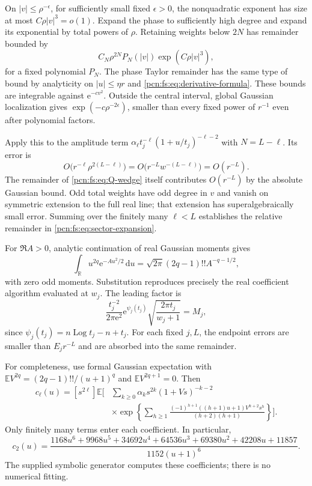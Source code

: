 \documentclass[11pt,letterpaper]{article}
\theoremstyle{remark}\newtheorem{remark}[theorem]{Remark}
\newcommand{\E}{\mathbb E}
\newcommand{\dd}{\,\mathrm d}
\newcommand{\ee}{\mathrm e}
\newcommand{\Log}{\operatorname{Log}}
\begin{document}
On $|v|\le\rho^{-\epsilon}$, for sufficiently small fixed $\epsilon>0$, the nonquadratic exponent has size at most $C\rho|v|^3=o(1)$. Expand the phase to sufficiently high degree and expand its exponential by total powers of $\rho$. Retaining weights below $2N$ has remainder bounded by
\[
 C_N\rho^{2N}P_N(|v|)\exp(C\rho|v|^3),
\]
for a fixed polynomial $P_N$. The phase Taylor remainder has the same type of bound by analyticity on $|u|\le\eta r$ and \eqref{pcn:fs:eq:derivative-formula}. These bounds are integrable against $\ee^{-cv^2}$. Outside the central interval, global Gaussian localization gives $\exp(-c\rho^{-2\epsilon})$, smaller than every fixed power of $r^{-1}$ even after polynomial factors.

Apply this to the amplitude term
$\alpha_\ell t_j^{-\ell}(1+u/t_j)^{-\ell-2}$ with $N=L-\ell$.
Its error is
\[
 O\bigl(r^{-\ell}\rho^{2(L-\ell)}\bigr)
       =O\bigl(r^{-L}w^{-(L-\ell)}\bigr)=O(r^{-L}).
\]
The remainder of \eqref{pcn:fs:eq:Q-wedge} itself contributes $O(r^{-L})$ by the absolute Gaussian bound. Odd total weights have odd degree in $v$ and vanish on symmetric extension to the full real line; that extension has superalgebraically small error. Summing over the finitely many $\ell<L$ establishes the relative remainder in \eqref{pcn:fs:eq:sector-expansion}.

For $\Re A>0$, analytic continuation of real Gaussian moments gives
\[
 \int_{\mathbb R}u^{2q}\ee^{-Au^2/2}\dd u
       =\sqrt{2\pi}(2q-1)!!A^{-q-1/2},
\]
with zero odd moments. Substitution reproduces precisely the real coefficient algorithm evaluated at $w_j$. The leading factor is
\[
 \frac{t_j^{-2}}{2\pi\ee^2}\ee^{\psi_j(t_j)}
       \sqrt{\frac{2\pi t_j}{w_j+1}}=M_j,
\]
since $\psi_j(t_j)=n\Log t_j-n+t_j$. For each fixed $j,L$, the endpoint errors are smaller than $E_jr^{-L}$ and are absorbed into the same remainder.

For completeness, use formal Gaussian expectation with
$\E V^{2q}=(2q-1)!!/(u+1)^q$ and $\E V^{2q+1}=0$. Then
\begin{align}\label{pcn:fs:eq:coefficient-generator}
 c_\ell(u)=[s^{2\ell}]\E\Bigg[&
 \sum_{k\ge0}\alpha_ks^{2k}(1+Vs)^{-k-2}\\
 &\times\exp\left\{\sum_{h\ge1}
 \frac{(-1)^{h+1}((h+1)u+1)V^{h+2}s^h}{(h+2)(h+1)}\right\}\Bigg].\nonumber
\end{align}
Only finitely many terms enter each coefficient. In particular,
\[
 c_2(u)=\frac{1168u^6+9968u^5+34692u^4+64536u^3
              +69380u^2+42208u+11857}{1152(u+1)^6}.
\]
The supplied symbolic generator computes these coefficients; there is no numerical fitting.
\end{document}
